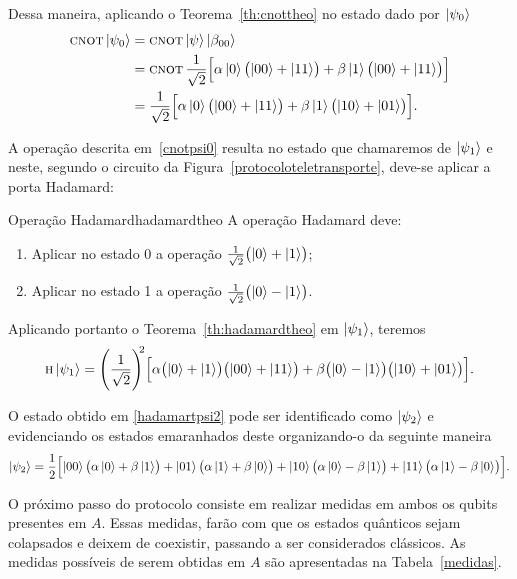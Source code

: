 Dessa maneira, aplicando o Teorema~\ref{th:cnottheo} no estado dado por $\ket{\psi_0}$
\begin{align}\label{cnotpsi0}
  \operatorname{\textsc{cnot}} \ket{\psi_0} &= \operatorname{\textsc{cnot}} \ket{\psi} \ket{\beta_{00}} \nonumber \\
                     &= \operatorname{\textsc{cnot}} \frac{1}{\sqrt{2}} \Bigl[ \alpha \ket{0} \bigl( \ket{00} + \ket{11} \bigr) + \beta \ket{1} \bigl( \ket{00} + \ket{11} \bigr)\Bigr] \nonumber \\
                     &= \frac{1}{\sqrt{2}} \Bigl[\alpha \ket{0} \bigl( \ket{00} + \ket{11} \bigr) + \beta \ket{1} \bigl( \ket{10} + \ket{01} \bigr) \Bigr].
\end{align}

A operação descrita em~\eqref{cnotpsi0} resulta no estado que chamaremos de $\ket{\psi_1}$ e neste, segundo o circuito da Figura~\ref{protocoloteletransporte}, deve-se aplicar a porta Hadamard:
\begin{theo}{Operação Hadamard}{hadamardtheo}
  A operação Hadamard deve:
  \begin{enumerate}[label=\roman*.]
    \item Aplicar no estado 0 a operação $\frac{1}{\sqrt{2}} \bigl(\ket{0}+\ket{1}\bigr)$;
    \item Aplicar no estado 1 a operação $\frac{1}{\sqrt{2}} \bigl(\ket{0}-\ket{1}\bigr)$.
  \end{enumerate}
\end{theo}

Aplicando portanto o Teorema~\ref{th:hadamardtheo} em $\ket{\psi_1}$, teremos
\begin{equation}\label{hadamartpsi2}
 \operatorname{\textsc{h}} \ket{\psi_1} = \Biggl( \frac{1}{\sqrt{2}}\Biggr)^{\!\!2} \Bigl[ \alpha \bigl( \ket{0} + \ket{1} \bigr)\bigl( \ket{00} +\ket{11} \bigr)+ \beta \bigl( \ket{0} - \ket{1} \bigr) \bigl( \ket{10} + \ket{01} \bigr) \Bigr].
\end{equation}

O estado obtido em \eqref{hadamartpsi2} pode ser identificado como $\ket{\psi_2}$ e evidenciando os estados emaranhados deste organizando-o da seguinte maneira
\begin{equation}\label{psi2}
 \ket{\psi_2} = \frac{1}{2} \Bigl[ \ket{00} \bigl( \alpha \ket{0} + \beta \ket{1} \bigr) + \ket{01} \bigl( \alpha \ket{1} + \beta \ket{0} \bigr) + \ket{10} \bigl( \alpha \ket{0} - \beta \ket{1} \bigr) + \ket{11} \bigl( \alpha \ket{1} - \beta \ket{0} \bigr) \Bigr].
\end{equation}

O próximo passo do protocolo consiste em realizar medidas em ambos os qubits presentes em \(A\). Essas medidas, farão com que os estados quânticos sejam colapsados e deixem de coexistir, passando a ser considerados clássicos. As medidas possíveis de serem obtidas em \(A\) são apresentadas na Tabela~\ref{medidas}.


